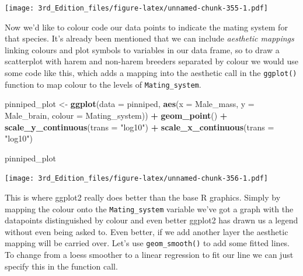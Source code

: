 \documentclass[
]{book}
\newenvironment{Shaded}{\begin{snugshade}}{\end{snugshade}}
\newcommand{\DataTypeTok}[1]{\textcolor[rgb]{0.13,0.29,0.53}{#1}}
\newcommand{\KeywordTok}[1]{\textcolor[rgb]{0.13,0.29,0.53}{\textbf{#1}}}
\newcommand{\NormalTok}[1]{#1}
\newcommand{\OperatorTok}[1]{\textcolor[rgb]{0.81,0.36,0.00}{\textbf{#1}}}
\newcommand{\StringTok}[1]{\textcolor[rgb]{0.31,0.60,0.02}{#1}}
\begin{document}
\texttt{[image: 3rd\_Edition\_files/figure-latex/unnamed-chunk-355-1.pdf]}

Now we'd like to colour code our data points to indicate the mating system for that species. It's already been mentioned that we can include \emph{aesthetic mappings} linking colours and plot symbols to variables in our data frame, so to draw a scatterplot with harem and non-harem breeders separated by colour we would use some code like this, which adds a mapping into the aesthetic call in the \texttt{ggplot()} function to map colour to the levels of \texttt{Mating\_system}.

\begin{Shaded}
\begin{Highlighting}[]

\NormalTok{pinniped_plot <-}\StringTok{ }\KeywordTok{ggplot}\NormalTok{(}\DataTypeTok{data =}\NormalTok{ pinniped, }\KeywordTok{aes}\NormalTok{(}\DataTypeTok{x =}\NormalTok{ Male_mass, }\DataTypeTok{y =}\NormalTok{ Male_brain, }\DataTypeTok{colour =}\NormalTok{ Mating_system)) }\OperatorTok{+}
\StringTok{        }\KeywordTok{geom_point}\NormalTok{() }\OperatorTok{+}\StringTok{ }
\StringTok{        }\KeywordTok{scale_y_continuous}\NormalTok{(}\DataTypeTok{trans =} \StringTok{"log10"}\NormalTok{) }\OperatorTok{+}
\StringTok{        }\KeywordTok{scale_x_continuous}\NormalTok{(}\DataTypeTok{trans =} \StringTok{"log10"}\NormalTok{)}

\NormalTok{pinniped_plot}
\end{Highlighting}
\end{Shaded}

\texttt{[image: 3rd\_Edition\_files/figure-latex/unnamed-chunk-356-1.pdf]}

This is where ggplot2 really does better than the base R graphics. Simply by mapping the colour onto the \texttt{Mating\_system} variable we've got a graph with the datapoints distinguished by colour and even better ggplot2 has drawn us a legend without even being asked to. Even better, if we add another layer the aesthetic mapping will be carried over. Let's use \texttt{geom\_smooth()} to add some fitted lines. To change from a loess smoother to a linear regression to fit our line we can just specify this in the function call.
\end{document}
